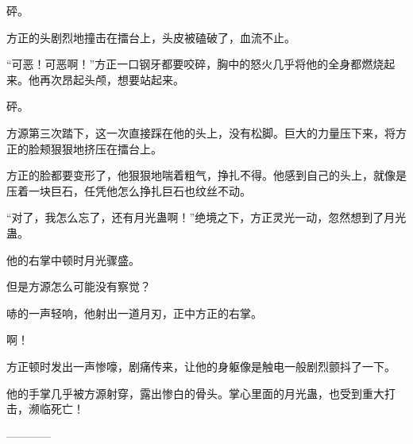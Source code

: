 \begin{this_body}
砰。

方正的头剧烈地撞击在擂台上，头皮被磕破了，血流不止。

“可恶！可恶啊！”方正一口钢牙都要咬碎，胸中的怒火几乎将他的全身都燃烧起来。他再次昂起头颅，想要站起来。

砰。

方源第三次踏下，这一次直接踩在他的头上，没有松脚。巨大的力量压下来，将方正的脸颊狠狠地挤压在擂台上。

方正的脸都要变形了，他狠狠地喘着粗气，挣扎不得。他感到自己的头上，就像是压着一块巨石，任凭他怎么挣扎巨石也纹丝不动。

“对了，我怎么忘了，还有月光蛊啊！”绝境之下，方正灵光一动，忽然想到了月光蛊。

他的右掌中顿时月光骤盛。

但是方源怎么可能没有察觉？

哧的一声轻响，他射出一道月刃，正中方正的右掌。

啊！

方正顿时发出一声惨嚎，剧痛传来，让他的身躯像是触电一般剧烈颤抖了一下。

他的手掌几乎被方源射穿，露出惨白的骨头。掌心里面的月光蛊，也受到重大打击，濒临死亡！

------------

\end{this_body}

